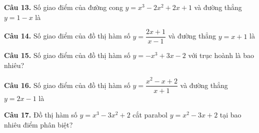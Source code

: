 \documentclass[12pt]{article}
\begin{document}
	\vspace{6mm}
	\noindent\textbf{Câu 13.} Số giao điểm của đường cong $y = x^3 - 2x^2 + 2x + 1$ và đường thẳng $y = 1 - x$ là
	\vspace{2mm}
	
	\noindent
	
	\vspace{6mm}
	\noindent\textbf{Câu 14.} Số giao điểm của đồ thị hàm số $y = \dfrac{2x + 1}{x - 1}$ và đường thẳng $y = x + 1$ là
	\vspace{2mm}
	
	\noindent
	
	\vspace{6mm}
	\noindent\textbf{Câu 15.} Số giao điểm của đồ thị hàm số $y = -x^3 + 3x - 2$ với trục hoành là bao nhiêu?
	\vspace{2mm}
	
	\noindent
	
	\vspace{6mm}
	\noindent\textbf{Câu 16.} Số giao điểm của đồ thị hàm số $y = \dfrac{x^2 - x + 2}{x + 1}$ và đường thẳng $y = 2x - 1$ là
	\vspace{2mm}
	
	\noindent
	
	\vspace{6mm}
	\noindent\textbf{Câu 17.} Đồ thị hàm số $y = x^3 - 3x^2 + 2$ cắt parabol $y = x^2 - 3x + 2$ tại bao nhiêu điểm phân biệt?
	\vspace{2mm}
	
	\noindent
	
\end{document}
